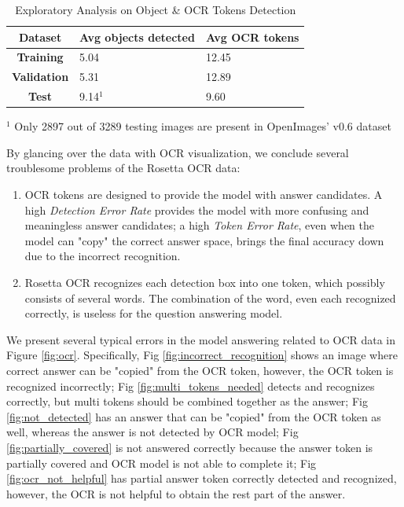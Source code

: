 \begin{table}[h]
\caption{Exploratory Analysis on Object \& OCR Tokens Detection }
\label{obj_ocr_analysis}
    \begin{center}
        \begin{tabularx}{\linewidth}{c|X X}
            \hline
            \textbf{Dataset} & Avg objects detected & Avg OCR tokens \\\hline
            \textbf{Training} & 5.04 & 12.45 \\
            \textbf{Validation} & 5.31 & 12.89 \\
            \textbf{Test} & 9.14$^1$ & 9.60 \\
            \hline
        \end{tabularx}
    \end{center}
    \begin{tablenotes}
        \item $^1$ Only 2897 out of 3289 testing images are present in OpenImages' v0.6 dataset
  \end{tablenotes}
\end{table}

By glancing over the data with OCR visualization, we conclude several troublesome problems of the Rosetta OCR data:
  \begin{enumerate}
    \item OCR tokens are designed to provide the model with answer candidates. A high \textit{Detection Error Rate} provides the model with more confusing and meaningless answer candidates; a high \textit{Token Error Rate}, even when the model can "copy" the correct answer space, brings the final accuracy down due to the incorrect recognition.
    \item Rosetta OCR recognizes each detection box into one token, which possibly consists of several words. The combination of the word, even each recognized correctly, is useless for the question answering model.
  \end{enumerate}
 
We present several typical errors in the model answering related to OCR data in Figure \ref{fig:ocr}. Specifically, Fig \ref{fig:incorrect_recognition} shows an image where correct answer can be "copied" from the OCR token, however, the OCR token is recognized incorrectly; Fig \ref{fig:multi_tokens_needed} detects and recognizes correctly, but multi tokens should be combined together as the answer; Fig \ref{fig:not_detected} has an answer that can be "copied" from the OCR token as well, whereas the answer is not detected by OCR model; Fig \ref{fig:partially_covered} is not answered correctly because the answer token is partially covered and OCR model is not able to complete it; Fig \ref{fig:ocr_not_helpful} has partial answer token correctly detected and recognized, however, the OCR is not helpful to obtain the rest part of the answer.

